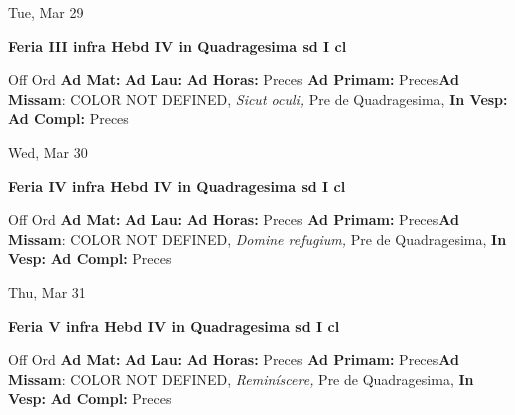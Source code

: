 \documentclass[10pt]{memoir}
\begin{document}
\begin{center}
\begin{minipage}{3.5in}
\vspace{2em}
\begin{center}Tue, Mar 29
\end{center}
\textbf{ \large Feria III infra Hebd IV in Quadragesima 
\textnormal{\normalsize sd I cl}}

\begin{justify}Off Ord
\textbf{Ad Mat: }
\textbf{Ad Lau: }
\textbf{Ad Horas: }Preces
\textbf{Ad Primam: }Preces\textbf{Ad Missam}: COLOR NOT DEFINED, \textit{Sicut oculi,} Pre de Quadragesima, 
\textbf{In Vesp: }
\textbf{Ad Compl: }Preces
\end{justify}
\end{minipage}
\end{center}

\begin{center}
\begin{minipage}{3.5in}
\vspace{2em}
\begin{center}Wed, Mar 30
\end{center}
\textbf{ \large Feria IV infra Hebd IV in Quadragesima 
\textnormal{\normalsize sd I cl}}

\begin{justify}Off Ord
\textbf{Ad Mat: }
\textbf{Ad Lau: }
\textbf{Ad Horas: }Preces
\textbf{Ad Primam: }Preces\textbf{Ad Missam}: COLOR NOT DEFINED, \textit{Domine refugium,} Pre de Quadragesima, 
\textbf{In Vesp: }
\textbf{Ad Compl: }Preces
\end{justify}
\end{minipage}
\end{center}

\begin{center}
\begin{minipage}{3.5in}
\vspace{2em}
\begin{center}Thu, Mar 31
\end{center}
\textbf{ \large Feria V infra Hebd IV in Quadragesima 
\textnormal{\normalsize sd I cl}}

\begin{justify}Off Ord
\textbf{Ad Mat: }
\textbf{Ad Lau: }
\textbf{Ad Horas: }Preces
\textbf{Ad Primam: }Preces\textbf{Ad Missam}: COLOR NOT DEFINED, \textit{Reminíscere,} Pre de Quadragesima, 
\textbf{In Vesp: }
\textbf{Ad Compl: }Preces
\end{justify}
\end{minipage}
\end{center}
\end{document}
